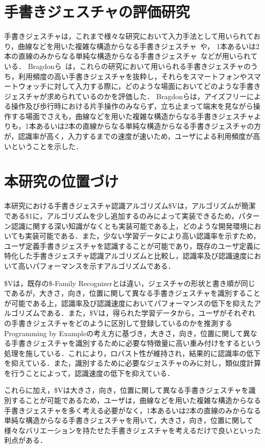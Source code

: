 \section{手書きジェスチャの評価研究}
手書きジェスチャは，これまで様々な研究において入力手法として用いられており，曲線などを用いた複雑な構造からなる手書きジェスチャ~\cite{Lu:2011:GAT:1978942.1978972,Li:2010:GST:1866029.1866044,Moran:1997:PIT:263407.263508,Hinckley:2007:ISS:1240624.1240666,Appert:2009:USC:1518701.1519052,Liao:2008:PGC:1314683.1314686,Zeleznik:2008:LCD:1449715.1449741}や，
1本あるいは2本の直線のみからなる単純な構造からなる手書きジェスチャ~\cite{Kurtenbach:1993:LEP:164632.164977}などが用いられている．
Bragdonら~\cite{Bragdon:2011:EAT:1978942.1979000}は，これらの研究において用いられる手書きジェスチャのうち，利用頻度の高い手書きジェスチャを抜粋し，それらをスマートフォンやスマートウォッチに対して入力する際に，どのような場面においてどのような手書きジェスチャが求められているのかを評価した．
Bragdonらは，アイズフリーによる操作及び歩行時における片手操作のみならず，立ち止まって端末を見ながら操作する場面でさえも，曲線などを用いた複雑な構造からなる手書きジェスチャよりも，1本あるいは2本の直線からなる単純な構造からなる手書きジェスチャの方が，認識率が高く，入力するまでの速度が速いため，ユーザによる利用頻度が高いということを示した．

\section{本研究の位置づけ}
本研究における手書きジェスチャ認識アルゴリズム\$Vは，アルゴリズムが簡潔である\$1に，アルゴリズムを少し追加するのみによって実装できるため，パターン認識に関する深い知識がなくとも実装可能である上，どのような開発環境においても実装可能である．また，少ない学習データにより高い認識率を示すため，ユーザ定義手書きジェスチャを認識することが可能であり，既存のユーザ定義に特化した手書きジェスチャ認識アルゴリズムと比較し，認識率及び認識速度において高いパフォーマンスを示すアルゴリズムである．

\$Vは，既存の\$-Family Recognizerとは違い，ジェスチャの形状と書き順が同じであるが，大きさ，向き，位置に関して異なる手書きジェスチャを識別することが可能である上，認識率及び認識速度においてパフォーマンスの低下を抑えたアルゴリズムである．また，\$Vは，得られた学習データから，ユーザがそれぞれの手書きジェスチャをどのように区別して登録しているのかを推測するProgramming by Exampleの考え方に基づき，大きさ，向き，位置に関して異なる手書きジェスチャを識別するために必要な特徴量に高い重み付けをするという処理を施している．これにより，ロバスト性が維持され，結果的に認識率の低下を抑えている．また，識別するために必要なジェスチャのみに対し，類似度計算を行うことによって，認識速度の低下を抑えている．

これらに加え，\$Vは大きさ，向き，位置に関して異なる手書きジェスチャを識別することが可能であるため，ユーザは，曲線などを用いた複雑な構造からなる手書きジェスチャを多く考える必要がなく，1本あるいは2本の直線のみからなる単純な構造からなる手書きジェスチャを用いて，大きさ，向き，位置に関して様々なバリエーションを持たせた手書きジェスチャを考えるだけで良いといった利点がある．





